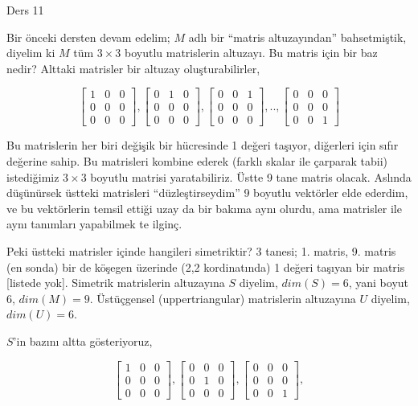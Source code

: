 \documentclass[12pt,fleqn]{article}\usepackage{../../common}
\begin{document}
Ders 11

Bir önceki dersten devam edelim; $M$ adlı bir ``matris altuzayından''
bahsetmiştik, diyelim ki $M$ tüm $3 \times 3$ boyutlu matrislerin
altuzayı. Bu matris için bir baz nedir? Alttaki matrisler bir altuzay
oluşturabilirler,

$$ 
\left[\begin{array}{rrr}
1 & 0 & 0 \\ 0 & 0 & 0 \\ 0 & 0 & 0
\end{array}\right],
\left[\begin{array}{rrr}
0 & 1 & 0 \\ 0 & 0 & 0 \\ 0 & 0 & 0
\end{array}\right],
\left[\begin{array}{rrr}
0 & 0 & 1 \\ 0 & 0 & 0 \\ 0 & 0 & 0
\end{array}\right]
,..,
\left[\begin{array}{rrr}
0 & 0 & 0 \\ 0 & 0 & 0 \\ 0 & 0 & 1
\end{array}\right]
 $$

Bu matrislerin her biri değişik bir hücresinde 1 değeri taşıyor, diğerleri
için sıfır değerine sahip. Bu matrisleri kombine ederek (farklı skalar ile
çarparak tabii) istediğimiz $3 \times 3$ boyutlu matrisi
yaratabiliriz. Üstte 9 tane matris olacak. Aslında düşünürsek üstteki
matrisleri ``düzleştirseydim'' 9 boyutlu vektörler elde ederdim, ve bu
vektörlerin temsil ettiği uzay da bir bakıma aynı olurdu, ama matrisler ile
aynı tanımları yapabilmek te ilginç. 

Peki üstteki matrisler içinde hangileri simetriktir? 3 tanesi; 1. matris,
9. matris (en sonda) bir de köşegen üzerinde (2,2 kordinatında) 1 değeri taşıyan
bir matris [listede yok]. Simetrik matrislerin altuzayına $S$ diyelim, $dim(S) =
6$, yani boyut 6, $dim(M) = 9$. Üstüçgensel (uppertriangular) matrislerin
altuzayına $U$ diyelim, $dim(U) = 6$.

$S$'in bazını altta gösteriyoruz, 

$$ 
\left[\begin{array}{rrr}
1 & 0 & 0 \\ 0 & 0 & 0 \\ 0 & 0 & 0
\end{array}\right],
\left[\begin{array}{rrr}
0 & 0 & 0 \\ 0 & 1 & 0 \\ 0 & 0 & 0
\end{array}\right],
\left[\begin{array}{rrr}
0 & 0 & 0 \\ 0 & 0 & 0 \\ 0 & 0 & 1
\end{array}\right],
 $$
\end{document}
